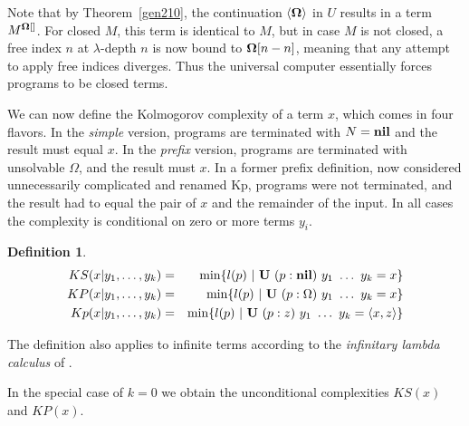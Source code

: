 \documentclass{article}
\newtheorem{definition}{Definition}
\newcommand{\tup}[1]{\langle #1 \rangle}
\newcommand{\pref}[2]{(#1:#2)}
\newcommand{\idx}[2]{#1[#2]}
\newcommand{\bnd}[2]{#1^{#2[]}}
\newcommand{\CU}{{\bf U}}
\newcommand{\COm}{{\bf \Omega}}
\newcommand{\Cnil}{{\bf nil}}
\begin{document}
Note that by Theorem~\ref{gen210},
the continuation $\tup{\COm}$ in $U$ results in a term
$\bnd{M}{\COm}$. For closed $M$, this term is identical to $M$,
but in case $M$ is not closed,
a free index $n$ at $\lambda$-depth $n$ is now bound to
$\idx{\COm}{n-n}$, meaning that any attempt to apply free indices diverges.
Thus the universal computer essentially forces programs to be closed terms.


We can now define the Kolmogorov complexity of a term $x$,
which comes in four flavors.
In the {\em simple} version, programs are terminated with
$N=\Cnil$ and the result must equal $x$.
In the {\em prefix} version, programs are terminated with unsolvable $\Omega$,
and the result must $x$.
In a former prefix definition, now considered unnecessarily complicated and renamed Kp, programs were not terminated,
and the result had to equal the pair of $x$ and the remainder of the input.
In all cases the complexity is conditional on zero or more terms $y_i$.

\begin{definition}
\begin{eqnarray*}
KS(x|y_1,\ldots,y_{k}) & = &
\min \{ l(p)\ |\ \CU\ \pref{p}{\Cnil}\ y_1\ \ldots\ y_{k} =      x    \} \\
KP(x|y_1,\ldots,y_{k}) & = &
\min \{ l(p)\ |\ \CU\ \pref{p}{\Omega}\ y_1\ \ldots\ y_{k} =     x    \} \\
Kp(x|y_1,\ldots,y_{k}) & = &
\min \{ l(p)\ |\ \CU\ \pref{p}{ z   }\ y_1\ \ldots\ y_{k} = \tup{x,z} \}
\end{eqnarray*}
\label{defait}
\end{definition}

The definition also applies to infinite terms according to the {\em infinitary lambda calculus}
of \cite{KKSV97}.

In the special case of $k=0$ we obtain the unconditional complexities $KS(x)$ and $KP(x)$.
\end{document}
